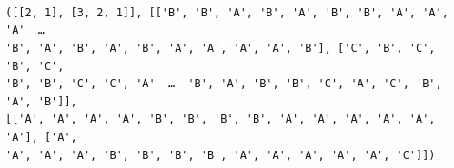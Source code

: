 \documentclass[11pt]{article}
\makeatletter
\newcommand{\boxspacing}{\kern\kvtcb@left@rule\kern\kvtcb@boxsep}
\newcommand{\prompt}[4]{
        {\ttfamily\llap{{\color{#2}[#3]:\hspace{3pt}#4}}\vspace{-\baselineskip}}
    }
\makeatother
\begin{document}
    \begin{Verbatim}[commandchars=\\\{\}]

    \end{Verbatim}

    \begin{center}
    \end{center}
    { \hspace*{\fill} \\}

    \begin{center}
    \end{center}
    { \hspace*{\fill} \\}

    \begin{Verbatim}[commandchars=\\\{\}]

    \end{Verbatim}

    \begin{center}
    \end{center}
    { \hspace*{\fill} \\}

    \begin{Verbatim}[commandchars=\\\{\}]

    \end{Verbatim}

            \begin{tcolorbox}[breakable, size=fbox, boxrule=.5pt, pad at break*=1mm, opacityfill=0]
\prompt{Out}{outcolor}{27}{\boxspacing}
\begin{Verbatim}[commandchars=\\\{\}]
([[2, 1], [3, 2, 1]], [['B', 'B', 'A', 'B', 'A', 'B', 'B', 'A', 'A', 'A'  …
'B', 'A', 'B', 'A', 'B', 'A', 'A', 'A', 'A', 'B'], ['C', 'B', 'C', 'B', 'C',
'B', 'B', 'C', 'C', 'A'  …  'B', 'A', 'B', 'B', 'C', 'A', 'C', 'B', 'A', 'B']],
[['A', 'A', 'A', 'A', 'B', 'B', 'B', 'B', 'A', 'A', 'A', 'A', 'A', 'A'], ['A',
'A', 'A', 'A', 'B', 'B', 'B', 'B', 'A', 'A', 'A', 'A', 'A', 'C']])
\end{Verbatim}
\end{tcolorbox}
\end{document}

